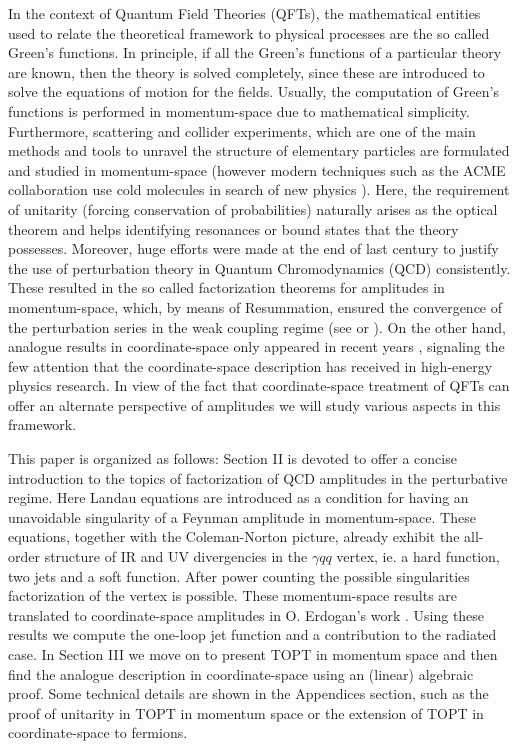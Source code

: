 \documentclass[%
 reprint,
 amsmath,amssymb,
 aps,
]{revtex4-1}
\begin{document}
In the context of Quantum Field Theories (QFTs), the mathematical entities used to relate the theoretical framework to physical processes are the so called Green's functions. In principle, if all the Green's functions of a particular theory are known, then the theory is solved completely, since these are introduced to solve the equations of motion for the fields. Usually, the computation of Green's functions is performed in momentum-space due to mathematical simplicity. Furthermore, scattering and collider experiments, which are one of the main methods and tools to unravel the structure of elementary particles are formulated and studied in momentum-space (however modern techniques such as the ACME collaboration use cold molecules in search of new physics \cite{ACME}). Here, the requirement of unitarity (forcing conservation of probabilities) naturally arises as the optical theorem and helps identifying resonances or bound states that the theory possesses. Moreover, huge efforts were made at the end of last century to justify the use of perturbation theory in Quantum Chromodynamics (QCD) consistently. These resulted in the so called factorization theorems for amplitudes in momentum-space, which, by means of Resummation, ensured the convergence of the perturbation series in the weak coupling regime (see \cite{Collins} or \cite{Stermannotes}). On the other hand, analogue results in coordinate-space only appeared in recent years \cite{ErdoganCS}, signaling the few attention that the coordinate-space description has received in high-energy physics research. In view of the fact that coordinate-space treatment of QFTs can offer an alternate perspective of amplitudes we will study various aspects in this framework. \par
This paper is organized as follows: Section II is devoted to offer a concise introduction to the topics of factorization of QCD amplitudes in the perturbative regime. Here Landau equations are introduced as a condition for having an unavoidable singularity of a Feynman amplitude in momentum-space. These equations, together with the Coleman-Norton picture, already exhibit the all-order structure of IR and UV divergencies in the $\gamma qq$ vertex, ie. a hard function, two jets and a soft function. After power counting the possible singularities factorization of the vertex is possible. These momentum-space results are translated to coordinate-space amplitudes in O. Erdogan's work \cite{ErdoganCS}. Using these results we compute the one-loop jet function and a contribution to the radiated case. In Section III we move on to present TOPT in momentum space and then find the analogue description in coordinate-space using an (linear) algebraic proof. Some technical details are shown in the Appendices section, such as the proof of unitarity in TOPT in momentum space or the extension of TOPT in coordinate-space to fermions.
\end{document}
